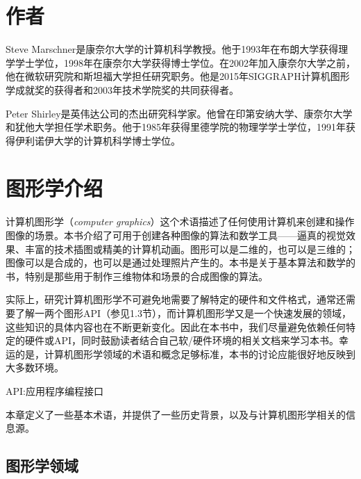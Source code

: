 \documentclass[lang=cn,12pt]{elegantbook}
\begin{document}



\vspace*{-1em}

\chapter{作者}

Steve Marschner是康奈尔大学的计算机科学教授。他于1993年在布朗大学获得理学学士学位，1998年在康奈尔大学获得博士学位。在2002年加入康奈尔大学之前，他在微软研究院和斯坦福大学担任研究职务。他是2015年SIGGRAPH计算机图形学成就奖的获得者和2003年技术学院奖的共同获得者。

Peter Shirley是英伟达公司的杰出研究科学家。他曾在印第安纳大学、康奈尔大学和犹他大学担任学术职务。他于1985年获得里德学院的物理学学士学位，1991年获得伊利诺伊大学的计算机科学博士学位。

\tableofcontents

\mainmatter

\chapter{图形学介绍}

计算机图形学（\textit{computer graphics}）这个术语描述了任何使用计算机来创建和操作图像的场景。本书介绍了可用于创建各种图像的算法和数学工具——逼真的视觉效果、丰富的技术插图或精美的计算机动画。图形可以是二维的，也可以是三维的；图像可以是合成的，也可以是通过处理照片产生的。本书是关于基本算法和数学的书，特别是那些用于制作三维物体和场景的合成图像的算法。

实际上，研究计算机图形学不可避免地需要了解特定的硬件和文件格式，通常还需要了解一两个图形API（参见1.3节），而计算机图形学又是一个快速发展的领域，这些知识的具体内容也在不断更新变化。因此在本书中，我们尽量避免依赖任何特定的硬件或API，同时鼓励读者结合自己软/硬件环境的相关文档来学习本书。幸运的是，计算机图形学领域的术语和概念足够标准，本书的讨论应能很好地反映到大多数环境。

\begin{note}
  API:应用程序编程接口
\end{note}

本章定义了一些基本术语，并提供了一些历史背景，以及与计算机图形学相关的信息源。

\section{图形学领域}
\end{document}
